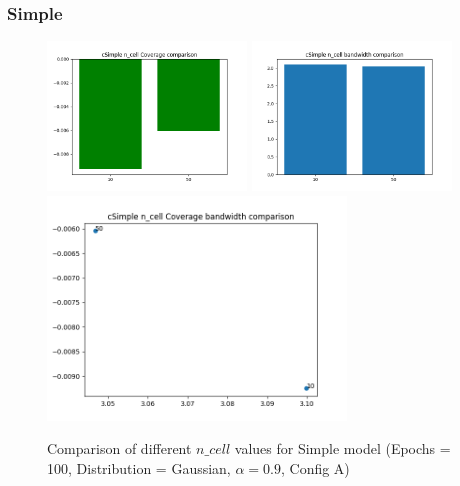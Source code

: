 \documentclass[a4paper, 12pt]{article}
\begin{document}
\subsubsection{Simple} \label{comp_simple}

\begin{figure}[!h]
    \centering
    \includegraphics[width=200px]{plots/hist/a/cSimple/n_cell/Coverage.png}
    \includegraphics[width=200px]{plots/hist/a/cSimple/n_cell/bandwidth.png}
    \includegraphics[width=300px]{plots/scatter/a/cSimple/n_cell/Coverage_bandwidth.png}
    \caption{Comparison of different $n\_cell$ values for Simple model (Epochs = 100, Distribution = Gaussian, $\alpha = 0.9$, Config A)}
    \label{fig:comp_simple}
\end{figure}
\end{document}
